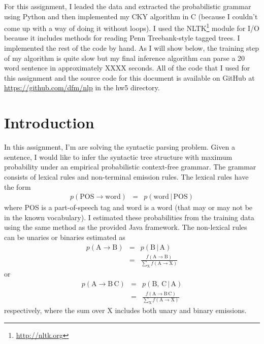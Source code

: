 \documentclass[11pt]{article}
\newcommand{\code}[1]{{\sffamily #1}}
\begin{document}
For this assignment, I leaded the data and extracted the probabilistic grammar
using Python and then implemented my CKY algorithm in C (because I couldn't
come up with a way of doing it without loops).
I used the NLTK\footnote{\url{http://nltk.org}} module for I/O because it
includes methods for reading Penn Treebank-style tagged trees.
I implemented the rest of the code by hand.
As I will show below, the training step of my algorithm is quite slow but my
final inference algorithm can parse a 20 word sentence in approximately XXXX
seconds.
All of the code that I used for this assignment and the source code for this
document is available on GitHub at \url{https://github.com/dfm/nlp} in the
\code{hw5} directory.

\section{Introduction}

In this assignment, I'm are solving the syntactic parsing problem.
Given a sentence, I would like to infer the syntactic tree structure with
maximum probability under an empirical probabilistic context-free grammar.
The grammar consists of lexical rules and non-terminal emission rules.
The lexical rules have the form
\begin{eqnarray}
p(\mathrm{POS} \to \mathrm{word}) &=& p(\mathrm{word}\,|\,\mathrm{POS})
\end{eqnarray}
where \code{POS} is a part-of-speech tag and \code{word} is a word (that may
or may not be in the known vocabulary).
I estimated these probabilities from the training data using the same method
as the provided Java framework.
The non-lexical rules can be unaries or binaries estimated as
\begin{eqnarray}
p(\mathrm{A} \to \mathrm{B}) &=& p(\mathrm{B}\,|\,\mathrm{A}) \\
                             &=& \frac{f(\mathrm{A}\to\mathrm{B})}
                                 {\sum_\mathrm{X} f(\mathrm{A}\to\mathrm{X})}
\end{eqnarray}
or
\begin{eqnarray}
p(\mathrm{A} \to \mathrm{B\,C}) &=& p(\mathrm{B},\,\mathrm{C}\,|\,\mathrm{A}) \\
                                &=& \frac{f(\mathrm{A}\to\mathrm{B\,C})}
                                    {\sum_\mathrm{X} f(\mathrm{A}\to\mathrm{X})}
\end{eqnarray}
respectively, where the sum over X includes both unary and binary emissions.
\end{document}
